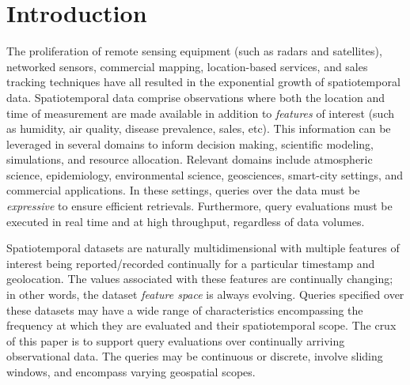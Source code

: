 \section{Introduction}
\label{sec:introduction}
The proliferation of remote sensing equipment (such as radars and satellites), networked sensors, commercial mapping, location-based services, and sales tracking techniques have all resulted in the exponential growth of spatiotemporal data. Spatiotemporal data comprise observations where both the location and time of measurement are made available in addition to \emph{features} of interest (such as humidity, air quality, disease prevalence, sales, etc). This information can be leveraged in several domains to inform decision making, scientific modeling, simulations, and resource allocation. Relevant domains include atmospheric science, epidemiology, environmental science, geosciences, smart-city settings, and commercial applications. In these settings, queries over the data must be \emph{expressive} to ensure efficient retrievals. Furthermore, query evaluations must be executed in real time and at high throughput, regardless of data volumes.

Spatiotemporal datasets are naturally multidimensional with multiple features of interest being reported/recorded continually for a particular timestamp and geolocation. The values associated with these features are continually changing; in other words, the dataset \emph{feature space} is always evolving.  Queries specified over these datasets may have a wide range of characteristics encompassing the frequency at which they are evaluated and their spatiotemporal scope. The crux of this paper is to support query evaluations over continually arriving observational data. The queries may be continuous or discrete, involve sliding windows, and encompass varying geospatial scopes.

